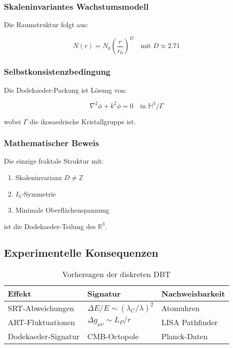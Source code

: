 \subsubsection{Skaleninvariantes Wachstumsmodell}
Die Raumstruktur folgt aus:

\begin{equation}
N(r) = N_0\left(\frac{r}{r_0}\right)^D \quad \text{mit } D \approx 2.71
\end{equation}

\subsubsection{Selbstkonsistenzbedingung}
Die Dodekaeder-Packung ist Lösung von:

\begin{equation}
\nabla^2\phi + k^2\phi = 0 \quad \text{in } \mathbb{H}^3/\Gamma
\end{equation}

wobei $\Gamma$ die ikosaedrische Kristallgruppe ist.

\subsubsection{Mathematischer Beweis}
\begin{theorem}
Die einzige fraktale Struktur mit:
\begin{enumerate}
\item Skaleninvarianz $D \neq \mathbb{Z}$
\item $I_h$-Symmetrie
\item Minimale Oberflächenspannung
\end{enumerate}
ist die Dodekaeder-Teilung des $\mathbb{R}^3$.
\end{theorem}

\subsection{Experimentelle Konsequenzen}
\label{subsec:experiments}

\begin{table}[h]
\centering
\caption{Vorhersagen der diskreten DBT}
\begin{tabular}{lll}
\hline
Effekt & Signatur & Nachweisbarkeit \\
\hline
SRT-Abweichungen & $\Delta E/E \sim (\lambda_C/\lambda)^2$ & Atomuhren \\
ART-Fluktuationen & $\Delta g_{\mu\nu} \sim L_P/r$ & LISA Pathfinder \\
Dodekaeder-Signatur & CMB-Octopole & Planck-Daten \\
\hline
\end{tabular}
\end{table}

